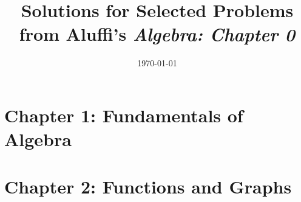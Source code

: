 \documentclass[a4paper,12pt]{book} %
\title{Solutions for Selected Problems from Aluffi's \textit{Algebra: Chapter 0}} %
\author{}
\date{\today}
\begin{document}
\maketitle

\frontmatter %
\tableofcontents
\mainmatter %


\chapter{Chapter 1: Fundamentals of Algebra} %

% 
% 

\chapter{Chapter 2: Functions and Graphs} %
% 
% 

% 
% 

\end{document}
